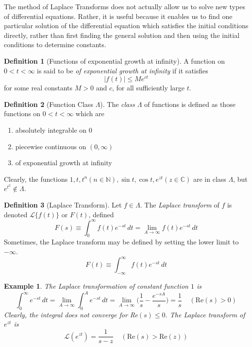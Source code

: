 \documentclass{article}
\newtheorem{example}{Example}[section]
\theoremstyle{remark}
\theoremstyle{definition}
\newtheorem{definition}{Definition}[section]
\begin{document}
  The method of Laplace Transforms does not actually allow us to solve new types of differential equations. Rather, it is useful because it enables us to find one particular solution of the differential equation which satisfies the initial conditions directly, rather than first finding the general solution and then using the initial conditions to determine constants. 

  \begin{definition}[Functions of exponential growth at infinity]
  A function on $0 < t < \infty$ is said to be \textit{of exponential growth at infinity} if it satisfies
  \[|f(t)| \leq M e^{ct}\]
  for some real constants $M>0$ and $c$, for all sufficiently large $t$. 
  \end{definition}

  \begin{definition}[Function Class $\Lambda$]
  The \textit{class $\Lambda$} of functions is defined as those functions on $0<t<\infty$ which are
  \begin{enumerate}
      \item absolutely integrable on $0$ 
      \item piecewise continuous on $(0, \infty)$
      \item of exponential growth at infinity
  \end{enumerate}
  Clearly, the functions $1, t, t^n (n \in \mathbb{N}), \sin{t}, \cos{t}, e^{zt} (z \in \mathbb{C})$ are in class $\Lambda$, but $e^{t^2} \not\in \Lambda$. 
  \end{definition}

  \begin{definition}[Laplace Transform]
  Let $f \in \Lambda$. The \textit{Laplace transform} of $f$ is denoted $\mathcal{L}\{f(t)\}$ or $F(t)$, defined
  \[F(s) \equiv \int_0^\infty f(t)e^{-s t} \, dt = \lim_{A \rightarrow \infty} f(t) e^{-st}\,dt \]
  Sometimes, the Laplace transform may be defined by setting the lower limit to $- \infty$. 
  \[F(t) \equiv \int_{-\infty}^\infty f(t) e^{-s t}\,dt\]
  \end{definition}

  \begin{example}
  The Laplace transformation of constant function $1$ is 
  \[\int_0^\infty e^{-st}\,dt = \lim_{A \rightarrow \infty} \int_0^A e^{-st} \,dt = \lim_{A \rightarrow \infty} \bigg( \frac{1}{s} - \frac{e^{-sA}}{s} \bigg) = \frac{1}{s}\;\;\;\; (\text{Re}(s) > 0)\]
  Clearly, the integral does not converge for Re$(s) \leq 0$. The Laplace transform of $e^{zt}$ is
  \[\mathcal{L} (e^{zt}) = \frac{1}{s-z} \;\;\;\; (\text{Re}(s)> \text{Re}(z))\]
  \end{example}
\end{document}
